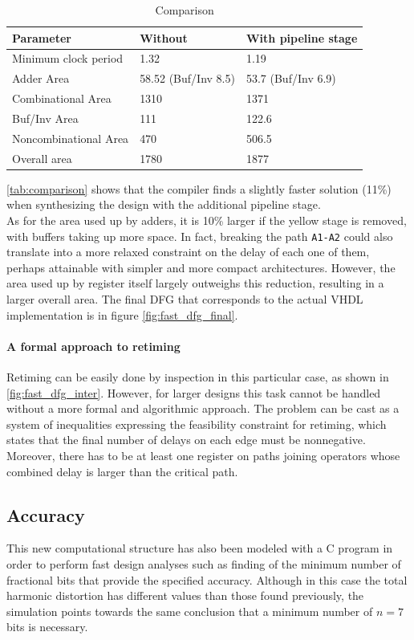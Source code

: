 \begin{table}[h]
\begin{tabular}{|lll|}
	\hline
Parameter	&  Without & With pipeline stage \\\hline
Minimum clock period & 1.32 & 1.19\\
Adder Area & 58.52 (Buf/Inv 8.5) & 53.7 (Buf/Inv 6.9)\\
Combinational Area & 1310 & 1371\\
Buf/Inv Area& 111 & 122.6\\
Noncombinational Area& 470 & 506.5\\
Overall area & 1780 & 1877\\
\hline
\end{tabular}
\caption{Comparison}
\label{tab:comparison}
\end{table}

\autoref{tab:comparison} shows that the compiler finds a slightly faster solution (11\%) when synthesizing the design with the additional pipeline stage.\\
As for the area used up by adders, it is 10\% larger if the yellow stage is removed, with buffers taking up more space. In fact, breaking the path \texttt{A1-A2} could also translate into a more relaxed constraint on the delay of each one of them, perhaps attainable with simpler and more compact architectures. However, the area used up by register itself largely outweighs this reduction, resulting in a larger overall area.
The final DFG that corresponds to the actual VHDL implementation is in figure \ref{fig:fast_dfg_final}.

\paragraph{A formal approach to retiming} Retiming can be easily done by inspection in this particular case, as shown in \autoref{fig:fast_dfg_inter}. However, for larger designs this task cannot be handled without a more formal and algorithmic approach. The problem can be cast as a system of inequalities expressing the feasibility constraint for retiming, which states that the final number of delays on each edge must be nonnegative. Moreover, there has to be at least one register on paths joining operators whose combined delay is larger than the critical path. 


\subsection{Accuracy}
This new computational structure has also been modeled with a C program in order to perform fast design analyses such as finding of the minimum number of fractional bits that provide the specified accuracy. Although in this case the total harmonic distortion has different values than those found previously, the simulation points towards the same conclusion that a minimum number of $n=7$ bits is necessary.
